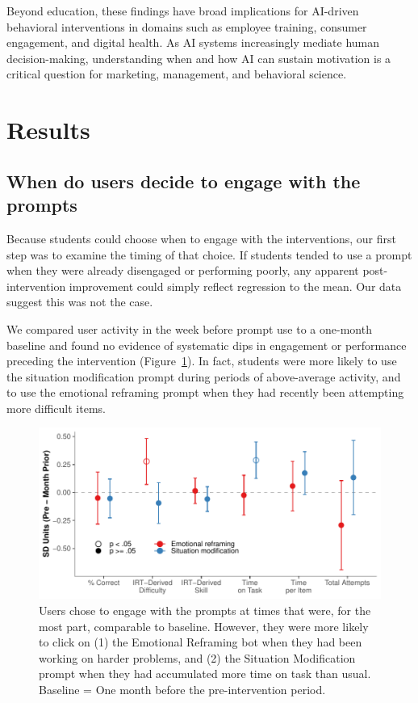 \documentclass[11pt]{report}
\begin{document}
\begin{mainf}
Beyond education, these findings have broad implications for AI-driven behavioral interventions in domains such as employee training, consumer engagement, and digital health. 
As AI systems increasingly mediate human decision-making, understanding when and how AI can sustain motivation is a critical question for marketing, management, and behavioral science.

\section{Results} 

\subsection{When do users decide to engage with the prompts}
Because students could choose when to engage with the interventions, our first step was to examine the timing of that choice.
If students tended to use a prompt when they were already disengaged or performing poorly, any apparent post-intervention improvement could simply reflect regression to the mean.
Our data suggest this was not the case. 

We compared user activity in the week before prompt use to a one-month baseline and found no evidence of systematic dips in engagement or performance preceding the intervention (Figure~\ref{fig:when_engage}). 
In fact, students were more likely to use the situation modification prompt during periods of above-average activity, and to use the emotional reframing prompt when they had recently been attempting more difficult items.


\begin{figure}
    \centering
    \includegraphics[width=\linewidth]{when_engage.pdf}
    \caption{Users chose to engage with the prompts at times that were, for the most part, comparable to baseline. However, they were more likely to click on (1) the Emotional Reframing bot when they had been working on harder problems, and (2) the Situation Modification prompt when they had accumulated more time on task than usual. Baseline = One month before the pre-intervention period.}
    \label{fig:when_engage}
\end{figure}


\end{mainf}
\end{document}
